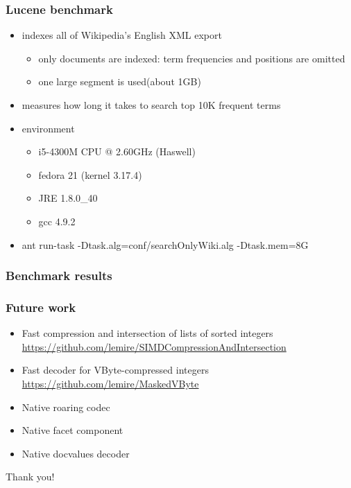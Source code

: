\documentclass{beamer}
\newcommand\hugefont{\fontsize{36}{42.2}\selectfont}
\begin{document}
	\begin{frame}
		\frametitle{Lucene benchmark}
		\begin{itemize}
			\item indexes all of Wikipedia's English XML export
				\begin{itemize}
					\item only documents are indexed: term frequencies and positions are omitted
					\item one large segment is used(about 1GB)
				\end{itemize}
			\item measures how long it takes to search top 10K frequent terms
			\item environment
			\begin{itemize}
				\item i5-4300M CPU @ 2.60GHz (Haswell)
				\item fedora 21 (kernel 3.17.4)
				\item JRE 1.8.0\_40
				\item gcc 4.9.2 
			\end{itemize}
			\item ant run-task -Dtask.alg=conf/searchOnlyWiki.alg -Dtask.mem=8G
		\end{itemize}
	\end{frame}
	\begin{frame}
		\frametitle{Benchmark results}
		\begin{center}
  		\begin{bchart}[step=5,min=30,max=65,unit=s]
            \smallskip
            \smallskip
    		\end{bchart}
		\end{center}
	\end{frame}
	\begin{frame}
		\frametitle{Future work}
		\begin{itemize}
			\item Fast compression and intersection of lists of sorted integers \url{https://github.com/lemire/SIMDCompressionAndIntersection}
			\item Fast decoder for VByte-compressed integers \url{https://github.com/lemire/MaskedVByte}
			\item Native roaring codec
			\item Native facet component
			\item Native docvalues decoder
		\end{itemize}
	\end{frame}
	\begin{frame}
		\hugefont
		\begin{center}
		Thank you!
		\end{center}
	\end{frame}
\end{document}
